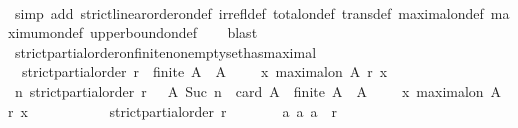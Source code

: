 \begin{isabellebody}
%
\isadelimproof
\ \ %
\endisadelimproof
%
\isatagproof
{}\isamarkupfalse%
\ {\isacharparenleft}simp\ add{\isacharcolon}\ strict{\isacharunderscore}linear{\isacharunderscore}order{\isacharunderscore}on{\isacharunderscore}def\ irrefl{\isacharunderscore}def\ total{\isacharunderscore}on{\isacharunderscore}def\ trans{\isacharunderscore}def\ maximal{\isacharunderscore}on{\isacharunderscore}def\ maximum{\isacharunderscore}on{\isacharunderscore}def\ upper{\isacharunderscore}bound{\isacharunderscore}on{\isacharunderscore}def{\isacharparenright}\isanewline
\ \ \isamarkupfalse%
\ blast%
\endisatagproof
{\isafoldproof}%
%
\isadelimproof
\isanewline
%
\endisadelimproof
\isanewline
{}\isamarkupfalse%
\ strict{\isacharunderscore}partial{\isacharunderscore}order{\isacharunderscore}on{\isacharunderscore}finite{\isacharunderscore}non{\isacharunderscore}empty{\isacharunderscore}set{\isacharunderscore}has{\isacharunderscore}maximal\ {\isacharcolon}\isanewline
\ \ {\isachardoublequoteopen}strict{\isacharunderscore}partial{\isacharunderscore}order\ r\ {\isasymlongrightarrow}\ finite\ A\ {\isasymlongrightarrow}\ A\ {\isasymnoteq}\ {\isasymemptyset}\ {\isasymlongrightarrow}\ {\isacharparenleft}{\isasymexists}\ x{\isachardot}\ maximal{\isacharunderscore}on\ A\ r\ x{\isacharparenright}{\isachardoublequoteclose}\isanewline
%
\isadelimproof
%
\endisadelimproof
%
\isatagproof
{}\isamarkupfalse%
\ {\isacharminus}\ \isanewline
\ \ \isamarkupfalse%
\ {\isachardoublequoteopen}{\isasymAnd}n{\isachardot}\ strict{\isacharunderscore}partial{\isacharunderscore}order\ r\ {\isasymLongrightarrow}\ {\isacharparenleft}{\isasymforall}\ A{\isachardot}\ Suc\ n\ {\isacharequal}\ card\ A\ {\isasymlongrightarrow}\ finite\ A\ {\isasymlongrightarrow}\ A\ {\isasymnoteq}\ {\isasymemptyset}\ {\isasymlongrightarrow}\ {\isacharparenleft}{\isasymexists}\ x{\isachardot}\ maximal{\isacharunderscore}on\ A\ r\ x{\isacharparenright}{\isacharparenright}{\isachardoublequoteclose}\isanewline
\ \ \isamarkupfalse%
\ {\isacharminus}\ \isanewline
\ \ \ \ \isamarkupfalse%
\ {\isachardoublequoteopen}strict{\isacharunderscore}partial{\isacharunderscore}order\ r{\isachardoublequoteclose}\isanewline
\ \ \ \ \isamarkupfalse%
\ \isamarkupfalse%
\ {\isachardoublequoteopen}{\isacharparenleft}{\isasymforall}a{\isachardot}\ {\isacharparenleft}a{\isacharcomma}\ a{\isacharparenright}\ {\isasymnotin}\ r{\isacharparenright}{\isachardoublequoteclose}\ \isanewline
\ \ \ \ \ \ \isamarkupfalse%

\end{isabellebody}
